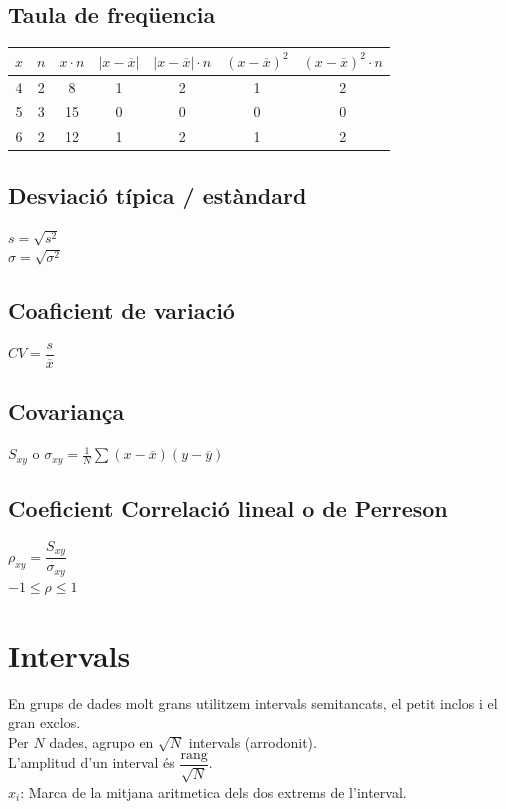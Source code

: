 \documentclass[12pt,a4paper]{article}
\begin{document}
\subsection{Taula de freqüencia}
\begin{table}[!ht]
    \centering
    \begin{tabular}{|c|c|c|c|c|c|c|}
        $x$ & $n$ & $x\cdot n$ & $|x-\overline{x}|$ & $|x-\overline{x}|\cdot n$ & $\left(x -\overline{x}\right)^2$ &  $\left(x -\overline{x}\right)^2\cdot n$ \\ \hline
        4 & 2 & 8 & 1 & 2 & 1 & 2 \\ 
        5 & 3 & 15 & 0 & 0 & 0 & 0 \\ 
        6 & 2 & 12 & 1 & 2 & 1 & 2 \\ 
    \end{tabular}
\end{table}
\subsection{Desviació típica / estàndard}
$s =\sqrt{s^2}$\\[5pt]
$\sigma = \sqrt{\sigma^2}$
\subsection{Coaficient de variació}
$CV = \dfrac{s}{\overline{x}}$
\subsection{Covariança}
$S_{xy}$ o $\sigma_{xy}=\frac{1}{N}\sum\left(x-\overline{x}\right)\left(y-\overline{y}\right)$
\subsection{Coeficient Correlació lineal o de Perreson}
$\rho_{xy}=\dfrac{S_{xy}}{\sigma_{xy}}$\\[5pt]
$-1 \leq \rho \leq 1$
\section{Intervals}
En grups de dades molt grans utilitzem intervals semitancats, el petit inclos i el gran exclos.\\
Per $N$ dades, agrupo en $\sqrt{N}$ intervals (arrodonit).\\
L'amplitud d'un interval és $\dfrac{\text{rang}}{\sqrt{N}}$.\\
$x_i$: Marca de la mitjana aritmetica dels dos extrems de l'interval.\\
\end{document}
